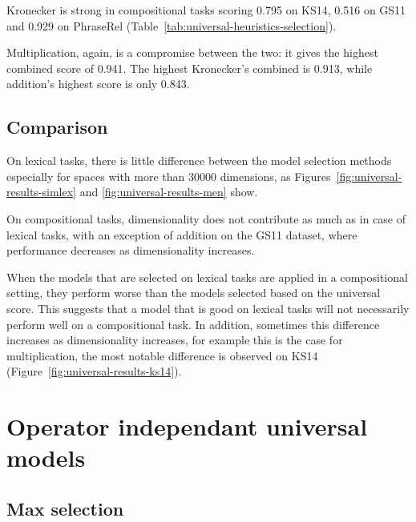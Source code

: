 Kronecker is strong in compositional tasks scoring 0.795 on KS14, 0.516 on GS11 and 0.929 on PhraseRel (Table~\ref{tab:universal-heuristics-selection}).

Multiplication, again, is a compromise between the two: it gives the highest combined score of 0.941. The highest Kronecker's combined is 0.913, while addition's highest score is only 0.843.

\subsection{Comparison}
\label{sec:comparison-universal}



On lexical tasks, there is little difference between the model selection methods especially for spaces with more than 30000 dimensions, as Figures~\ref{fig:universal-results-simlex} and \ref{fig:universal-results-men} show.

On compositional tasks, dimensionality does not contribute as much as in case of lexical tasks, with an exception of addition on the GS11 dataset, where performance decreases as dimensionality increases.

When the models that are selected on lexical tasks are applied in a compositional setting, they perform worse than the models selected based on the universal score. This suggests that a model that is good on lexical tasks will not necessarily perform well on a compositional task. In addition, sometimes this difference increases as dimensionality increases, for example this is the case for multiplication, the most notable difference is observed on KS14 (Figure~\ref{fig:universal-results-ks14}).


\section{Operator independant universal models}


\subsection{Max selection}
\label{sec:max-selection-single}

